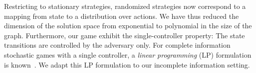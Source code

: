 Restricting to stationary strategies,  randomized strategies now correspond to a mapping from state to a distribution over actions. We have thus reduced the dimension of the solution space from exponential to polynomial in the size of the graph.
Furthermore, our game exhibit the single-controller property: The state transitions are controlled by the adversary only. For complete information stochastic games with a single controller, a \emph{linear programming} (LP) formulation is known~\cite{Raghavan2003}. We adapt this LP formulation to our incomplete information setting.
 

